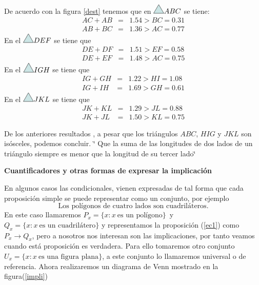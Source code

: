 De acuerdo con la figura \ref{dest} tenemos que en $\triangulo ABC $ se tiene: \begin{eqnarray} 
AC+AB & = & 1.54 > BC = 0.31 \\
AB + BC & = & 1.36> AC =  0.77 \end{eqnarray}
En el $\triangulo DEF$ se tiene que  
\begin{eqnarray}
DE+DF & = & 1.51 > EF=0.58 \\
DE + EF &=& 1.48> AC =0.75 \end{eqnarray}
En el $\triangulo IGH$ se tiene que 
\begin{eqnarray} IG+GH & = & 1.22 > HI=1.08 \\
IG + IH &=& 1.69> GH=0.61 \end{eqnarray} 
En el $\triangulo JKL$ se tiene que 
\begin{eqnarray}
JK+KL & = & 1.29 > JL=0.88 \\
JK + JL &=& 1.50> KL=0.75 
\end{eqnarray}

De los anteriores resultados , a pesar que los triángulos $ABC$,
$HIG$ y $JKL$ son isósceles, podemos concluir. \char`\"{} Que la
suma de las longitudes de dos lados de un triángulo siempre es menor
que la longitud de su tercer lado\char`\"{}

\textbf{Cuantificadores y otras formas de expresar la implicación}

En algunos casos las condicionales, vienen expresadas de tal forma
que cada proposición simple se puede representar como un conjunto,
por ejemplo 
\begin{equation}
\mbox{Los polígonos de cuatro lados son cuadriláteros.}\label{ec1}
\end{equation}
 En este caso llamaremos $P_{x}=\{x:x\ \mbox{es un polígono}\}$\ y
$Q_{x}=\{x:x\ \mbox{es un cuadrilátero}\}$ y representamos la proposición
(\eqref{ec1}) como $P_{x}\rightarrow Q_{x}$, pero a nosotros nos
interesan son las implicaciones, por tanto veamos cuando está proposición
es verdadera. Para ello tomaremos otro conjunto $U_{x}=\{x:x\ \mbox{es una figura plana}\}$,
a este conjunto lo llamaremos universal o de referencia. Ahora realizaremos
un diagrama de Venn mostrado en la figura(\ref{impli})

